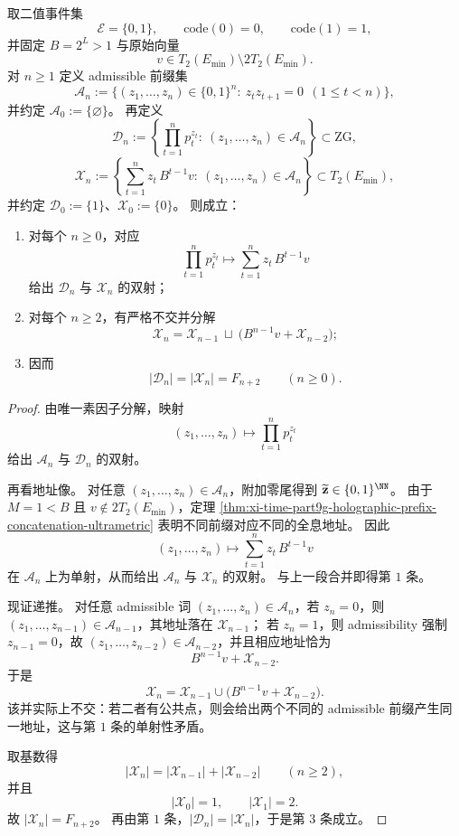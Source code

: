 \begin{theorem}\label{thm:xi-time-part9g-zg-primorial-fibonacci-affine-recursion}
取二值事件集
\[
\mathcal E=\{0,1\},
\qquad
\mathrm{code}(0)=0,\qquad \mathrm{code}(1)=1,
\]
并固定 \(B=2^L>1\) 与原始向量
\[
v\in T_2(E_{\min})\setminus 2T_2(E_{\min}).
\]
对 \(n\ge 1\) 定义 admissible 前缀集
\[
\mathcal A_n
:=
\bigl\{
(z_1,\dots,z_n)\in\{0,1\}^n:\ z_tz_{t+1}=0\ \ (1\le t<n)
\bigr\},
\]
并约定 \(\mathcal A_0:=\{\varnothing\}\)。
再定义
\[
\mathcal D_n:=
\left\{
\prod_{t=1}^{n}p_t^{z_t}:\ (z_1,\dots,z_n)\in\mathcal A_n
\right\}\subset \mathrm{ZG},
\]
\[
\mathcal X_n:=
\left\{
\sum_{t=1}^{n}z_t\,B^{t-1}v:\ (z_1,\dots,z_n)\in\mathcal A_n
\right\}\subset T_2(E_{\min}),
\]
并约定 \(\mathcal D_0:=\{1\}\)、\(\mathcal X_0:=\{0\}\)。
则成立：
\begin{enumerate}
  \item 对每个 \(n\ge 0\)，对应
  \[
  \prod_{t=1}^{n}p_t^{z_t}
  \longmapsto
  \sum_{t=1}^{n}z_t\,B^{t-1}v
  \]
  给出 \(\mathcal D_n\) 与 \(\mathcal X_n\) 的双射；
  \item 对每个 \(n\ge 2\)，有严格不交并分解
  \[
  \mathcal X_n
  =
  \mathcal X_{n-1}\ \sqcup\ \bigl(B^{n-1}v+\mathcal X_{n-2}\bigr);
  \]
  \item 因而
  \[
  |\mathcal D_n|=|\mathcal X_n|=F_{n+2}
  \qquad (n\ge 0).
  \]
\end{enumerate}
\end{theorem}
\begin{proof}
由唯一素因子分解，映射
\[
(z_1,\dots,z_n)\longmapsto \prod_{t=1}^{n}p_t^{z_t}
\]
给出 \(\mathcal A_n\) 与 \(\mathcal D_n\) 的双射。

再看地址像。
对任意 \((z_1,\dots,z_n)\in\mathcal A_n\)，附加零尾得到 \(\widetilde{\mathbf z}\in\{0,1\}^{\NN}\)。
由于 \(M=1<B\) 且 \(v\notin 2T_2(E_{\min})\)，定理 \ref{thm:xi-time-part9g-holographic-prefix-concatenation-ultrametric} 表明不同前缀对应不同的全息地址。
因此
\[
(z_1,\dots,z_n)\longmapsto \sum_{t=1}^{n}z_t\,B^{t-1}v
\]
在 \(\mathcal A_n\) 上为单射，从而给出 \(\mathcal A_n\) 与 \(\mathcal X_n\) 的双射。
与上一段合并即得第 \(1\) 条。

现证递推。
对任意 admissible 词 \((z_1,\dots,z_n)\in\mathcal A_n\)，若 \(z_n=0\)，则 \((z_1,\dots,z_{n-1})\in\mathcal A_{n-1}\)，其地址落在 \(\mathcal X_{n-1}\)；
若 \(z_n=1\)，则 admissibility 强制 \(z_{n-1}=0\)，故 \((z_1,\dots,z_{n-2})\in\mathcal A_{n-2}\)，并且相应地址恰为
\[
B^{n-1}v+\mathcal X_{n-2}.
\]
于是
\[
\mathcal X_n=\mathcal X_{n-1}\cup \bigl(B^{n-1}v+\mathcal X_{n-2}\bigr).
\]
该并实际上不交：若二者有公共点，则会给出两个不同的 admissible 前缀产生同一地址，这与第 \(1\) 条的单射性矛盾。

取基数得
\[
|\mathcal X_n|=|\mathcal X_{n-1}|+|\mathcal X_{n-2}|
\qquad (n\ge 2),
\]
并且
\[
|\mathcal X_0|=1,\qquad |\mathcal X_1|=2.
\]
故 \(|\mathcal X_n|=F_{n+2}\)。
再由第 \(1\) 条，\(|\mathcal D_n|=|\mathcal X_n|\)，于是第 \(3\) 条成立。
\end{proof}

\endinput
